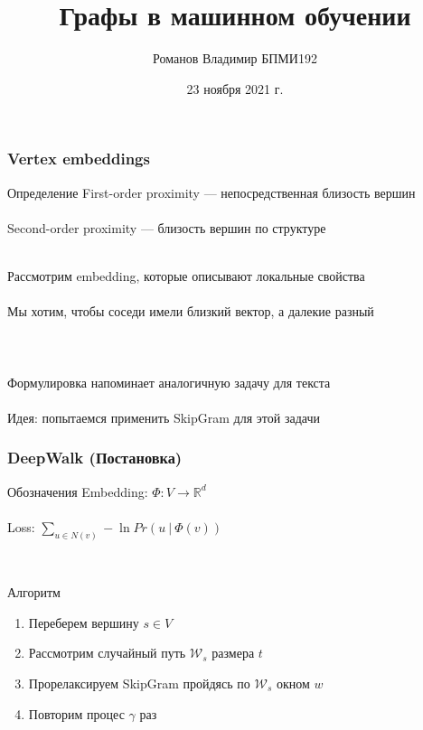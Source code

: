 \documentclass{beamer}
\title{Графы в машинном обучении}
\author[Романов Владимир]{Романов Владимир БПМИ192}
\institute[ВШЭ]{Национальный исследовательский университет \\ «Высшая школа экономики» (Москва)}
\date{23 ноября 2021 г.}
\newcommand{\R}{\mathbb{R}}
\newcommand{\skipline}[0]{$ $\\}
\begin{document}
\frame{\titlepage}





\begin{frame}
    \frametitle{Vertex embeddings}
    \begin{block}{Определение}
        First-order proximity --- непосредственная близость вершин 
        \skipline
        \skipline
        Second-order proximity --- близость вершин по структуре
    \end{block}
    \skipline
    Рассмотрим embedding, которые описывают локальные свойства
    \skipline
    \skipline
    Мы хотим, чтобы соседи имели близкий вектор, а далекие разный
    \skipline
    \skipline
    \skipline
    \skipline
    Формулировка напоминает аналогичную задачу для текста
    \skipline
    \skipline
    Идея: попытаемся применить SkipGram для этой задачи
\end{frame}

\begin{frame}
    \frametitle{DeepWalk (Постановка)}

    \begin{block}{Обозначения}
        Embedding: $\varPhi: V \to \R^d$ 
        \skipline
        \skipline
        Loss: $\sum_{u \in N(v)} -\ln Pr\left(u \ \vert\ \varPhi(v)\right)$
    \end{block}
    \skipline
    \begin{block}{Алгоритм}
        \begin{enumerate}
            \item Переберем вершину $s \in V$
            \item Рассмотрим случайный путь $\mathcal{W}_s$ размера $t$
            \item Прорелаксируем SkipGram пройдясь по $\mathcal{W}_s$ окном $w$
            \item Повторим процес $\gamma$ раз
        \end{enumerate}
    \end{block}
\end{frame}
\end{document}
